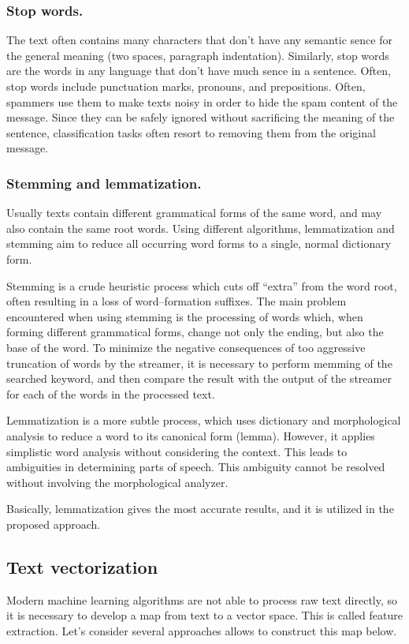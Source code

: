 \documentclass[12pt]{jpconf}
\begin{document}
\subsubsection*{Stop words.}
The text often contains many characters that don't have any semantic sence for the general meaning (two spaces, paragraph indentation).
Similarly, stop words are the words in any language that don't have much sence in a sentence. Often, stop words include punctuation marks, pronouns, and prepositions. Often, spammers use them to make texts noisy in order to hide the spam content of the message. Since they can be safely ignored without sacrificing the meaning of the sentence, classification tasks often resort to removing them from the original message.

\subsubsection*{Stemming and lemmatization.}
Usually texts contain different grammatical forms of the same word, and may also contain the same root words. Using different algorithms, lemmatization and stemming aim to reduce all occurring word forms to a single, normal dictionary form.

Stemming is a crude heuristic process which cuts off ``extra'' from the word root, often resulting in a loss of word--formation suffixes. The main problem encountered when using stemming is the processing of words which, when forming different grammatical forms, change not only the ending, but also the base of the word. To minimize the negative consequences of too aggressive truncation of words by the streamer, it is necessary to perform memming of the searched keyword, and then compare the result with the output of the streamer for each of the words in the processed text. 

Lemmatization is a more subtle process, which uses dictionary and morphological analysis to reduce a word to its canonical form (lemma). However, it applies simplistic word analysis without considering the context. This leads to ambiguities in determining parts of speech. This ambiguity cannot be resolved without involving the morphological analyzer.

Basically, lemmatization gives the most accurate results, and it is utilized in the proposed approach.

\subsection{Text vectorization}
Modern machine learning algorithms are not able to process raw text directly, so it is necessary to develop a map from text to a vector space. This is called feature extraction. 
Let's consider several approaches allows to construct this map below.
\end{document}
